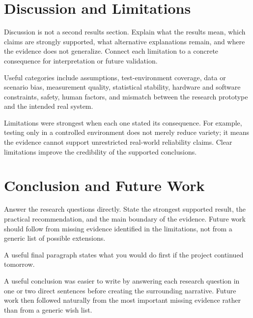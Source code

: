 \documentclass[a4paper,11pt,oneside]{article}
\begin{document}
  \section{Discussion and Limitations}

  \begin{guidance}
  Discussion is not a second results section. Explain what the results mean,
  which claims are strongly supported, what alternative explanations remain,
  and where the evidence does not generalize. Connect each limitation to a
  concrete consequence for interpretation or future validation.

  Useful categories include assumptions, test-environment coverage, data or
  scenario bias, measurement quality, statistical stability, hardware and
  software constraints, safety, human factors, and mismatch between the
  research prototype and the intended real system.
  \end{guidance}

  \begin{experiencenote}
  Limitations were strongest when each one stated its consequence. For example,
  testing only in a controlled environment does not merely reduce variety; it
  means the evidence cannot support unrestricted real-world reliability claims.
  Clear limitations improve the credibility of the supported conclusions.
  \end{experiencenote}

  \section{Conclusion and Future Work}

  \begin{guidance}
  Answer the research questions directly. State the strongest supported result,
  the practical recommendation, and the main boundary of the evidence. Future
  work should follow from missing evidence identified in the limitations, not
  from a generic list of possible extensions.

  A useful final paragraph states what you would do first if the project
  continued tomorrow.
  \end{guidance}

  \begin{experiencenote}
  A useful conclusion was easier to write by answering each research question in
  one or two direct sentences before creating the surrounding narrative. Future
  work then followed naturally from the most important missing evidence rather
  than from a generic wish list.
  \end{experiencenote}
\end{document}
